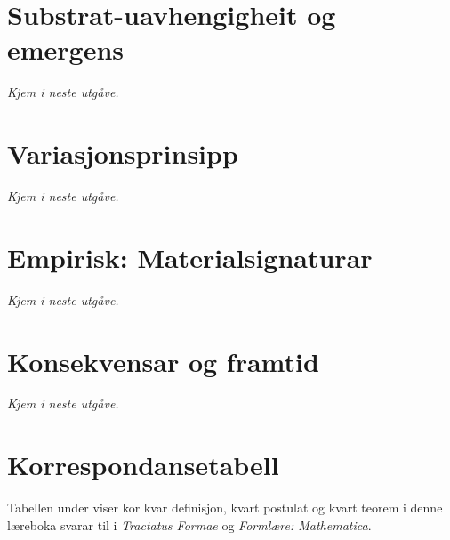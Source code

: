 \documentclass[10pt]{book}
\theoremstyle{definition}
\theoremstyle{plain}
\theoremstyle{remark}
\begin{document}
\chapter{Substrat-uavhengigheit og emergens}\label{kap:substrat}
\textit{Kjem i neste utgåve.}

\chapter{Variasjonsprinsipp}\label{kap:variasjon}
\textit{Kjem i neste utgåve.}

\chapter{Empirisk: Materialsignaturar}\label{kap:empirisk}
\textit{Kjem i neste utgåve.}

\chapter{Konsekvensar og framtid}\label{kap:konsekvensar}
\textit{Kjem i neste utgåve.}


\appendix
\chapter{Korrespondansetabell}\label{tillegg:korrespondanse}

Tabellen under viser kor kvar definisjon, kvart postulat og kvart teorem i denne l\ae reboka svarar til i \textit{Tractatus Formae} og \textit{Forml\ae re: Mathematica}.
\end{document}
